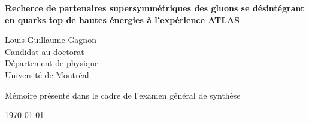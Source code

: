 \thispagestyle{empty}
\begin{center}
\begin{minipage}{0.75\linewidth}
    \centering
    \vspace{3cm}
    
    {\bf {\Large Recherce de partenaires supersymmétriques des gluons se
        désintégrant en quarks top de hautes énergies à l'expérience ATLAS \\ }}
    \vspace{3cm}

    {{\Large Louis-Guillaume Gagnon}\\Candidat au doctorat\\
      Département de physique\\ Université de Montréal\par}
    \vspace{3cm}

    {\Large Mémoire présenté dans le cadre de l'examen général de synthèse\\}
    \vspace{4cm}

    {\Large \today}
\end{minipage}
\end{center}
\clearpage